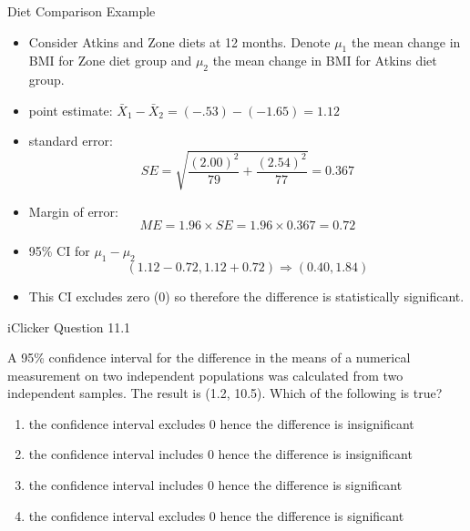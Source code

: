 \documentclass[14pt]{beamer}\usepackage[]{graphicx}\usepackage[]{color}
\begin{document}
\begin{frame}[fragile]{Diet Comparison Example}

{\footnotesize{
\begin{itemize}
\item<1-> Consider Atkins and Zone diets at 12 months. Denote $\mu_1$ the mean  change in BMI for Zone diet group and $\mu_2$ the mean change in BMI for  Atkins diet group.

\item<2-> point estimate: $\bar{X}_1 - \bar{X}_2 = (-.53) - (-1.65 ) = 1.12$

\item<3-> standard error:
\begin{equation*}
SE = \sqrt{ \frac{(2.00)^2}{79} + \frac{(2.54)^2}{77}} = 0.367
\end{equation*}

\item<4-> Margin of error:
\begin{equation*}
ME = 1.96 \times SE = 1.96 \times 0.367 = 0.72
\end{equation*}

\item<5-> 95\% CI for $\mu_1 - \mu_2$
\begin{equation*}
( 1.12 - 0.72, 1.12 + 0.72) \Rightarrow (0.40, 1.84)
\end{equation*}

\item<6-> This CI excludes zero (0) so therefore the difference is statistically significant.
\end{itemize}
}}
\end{frame}

\begin{frame}[fragile]{iClicker Question 11.1}

{\small{
A 95\% confidence interval for the difference in the means of a  numerical measurement on two independent populations was  calculated from two independent samples. The result is (1.2, 10.5).  Which of the following is true?

\begin{enumerate}
\item the confidence interval excludes 0 hence the difference is insignificant
\item the confidence interval includes 0 hence the difference is insignificant
\item the confidence interval includes 0 hence the difference is significant
\item the confidence interval excludes 0 hence the difference is significant
\end{enumerate}
}}
\end{frame}
\end{document}
